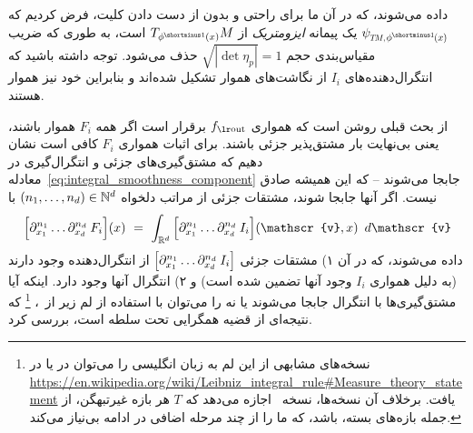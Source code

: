 داده می‌شوند، که در آن ما برای راحتی و بدون از دست دادن کلیت، فرض کردیم که
$\psi_{\protect\scalebox{.65}{$T\!M\mkern-1mu,\mkern2mu$}\protect\scalebox{.75}{$\phi^{\mkern-1mu\shortminus1}\mkern-1mu(x)$}}$
یک پیمانه \emph{ایزومتریک} از $T_{\phi^{\mkern-1mu\shortminus1}\mkern-1mu(x)}M$ است، به طوری که ضریب مقیاس‌بندی حجم $\sqrt{|\! \det\eta_p|} = 1$ حذف می‌شود.
توجه داشته باشید که انتگرال‌دهنده‌های $I_i$ از نگاشت‌های هموار تشکیل شده‌اند و بنابراین خود نیز هموار هستند.


از بحث قبلی روشن است که همواری $\fout$ برقرار است اگر همه $F_i$ هموار باشند، یعنی بی‌نهایت بار مشتق‌پذیر جزئی باشند.
برای اثبات همواری $F_i$ کافی است نشان دهیم که مشتق‌گیری‌های جزئی و انتگرال‌گیری در معادله~\eqref{eq:integral_smoothness_component} جابجا می‌شوند -- که این همیشه صادق نیست.
اگر آنها جابجا شوند، مشتقات جزئی از مراتب دلخواه $(n_1,\dots,n_d) \in \mathbb{N}^d$ با
\begin{align}\label{eq:APX_smoothness_partial_diff_swapping}
    \Big[ \partial_{x_1}^{n_1} \dots \partial_{x_d}^{n_d}\: F_i \Big](x)
    \ =\ \int_{\R^d} \Big[ \partial_{x_1}^{n_1} \dots \partial_{x_d}^{n_d}\: I_i\Big] (\mathscr{v},x)\,\ d\mathscr{v}
\end{align}
داده می‌شوند، که در آن
۱) مشتقات جزئی $\pig[ \partial_{x_1}^{n_1} \dots \partial_{x_d}^{n_d}\: I_i\pig]$ از انتگرال‌دهنده وجود دارند (به دلیل همواری $I_i$ وجود آنها تضمین شده است) و
۲) انتگرال آنها وجود دارد.
اینکه آیا مشتق‌گیری‌ها با انتگرال جابجا می‌شوند یا نه را می‌توان با استفاده از لم زیر
از~\cite{forster2012analysis3}،%
\footnote{
    نسخه‌های مشابهی از این لم به زبان انگلیسی را می‌توان در \cite{klenke2006probability} یا در
    \url{https://en.wikipedia.org/wiki/Leibniz_integral_rule\#Measure_theory_statement} یافت.
    برخلاف آن نسخه‌ها، نسخه~\cite{forster2012analysis3} اجازه می‌دهد که $T$ هر بازه غیرتبهگن، از جمله بازه‌های بسته، باشد، که ما را از چند مرحله اضافی در ادامه بی‌نیاز می‌کند.
}
که نتیجه‌ای از قضیه همگرایی تحت سلطه است، بررسی کرد.

